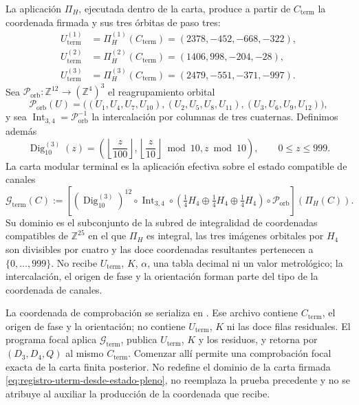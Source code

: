 La aplicación \(\Pi_H\), ejecutada dentro de la carta, produce a partir de
\(C_{\mathrm{term}}\) la coordenada firmada y sus tres órbitas de paso tres:
\begin{align*}
 U_{\mathrm{term}}^{(1)}&=\Pi_H^{(1)}(C_{\mathrm{term}})
                         =(2378,-452,-668,-322),\\
 U_{\mathrm{term}}^{(2)}&=\Pi_H^{(2)}(C_{\mathrm{term}})
                         =(1406,998,-204,-28),\\
 U_{\mathrm{term}}^{(3)}&=\Pi_H^{(3)}(C_{\mathrm{term}})
                         =(2479,-551,-371,-997).
\end{align*}
Sea \(\mathcal P_{\mathrm{orb}}:\mathbb Z^{12}\to(\mathbb Z^4)^3\) el
reagrupamiento orbital
\[
 \mathcal P_{\mathrm{orb}}(U)
 =\bigl((U_1,U_4,U_7,U_{10}),
        (U_2,U_5,U_8,U_{11}),
        (U_3,U_6,U_9,U_{12})\bigr),
\]
y sea \(\operatorname{Int}_{3,4}=\mathcal P_{\mathrm{orb}}^{-1}\) la
intercalación por columnas de tres cuaternas. Definimos además
\[
 \operatorname{Dig}_{10}^{(3)}(z)
 =\left(\left\lfloor\frac z{100}\right\rfloor,
         \left\lfloor\frac z{10}\right\rfloor\bmod10,
         z\bmod10\right),\qquad0\le z\le999.
\]
La carta modular terminal es la aplicación efectiva sobre el estado compatible
de canales
\begin{equation}
 \mathcal G_{\mathrm{term}}(C)
 :=\left[(\operatorname{Dig}_{10}^{(3)})^{12}
 \circ\operatorname{Int}_{3,4}
 \circ\left(\tfrac14H_4\oplus\tfrac14H_4
                    \oplus\tfrac14H_4\right)
  \circ\mathcal P_{\mathrm{orb}}\right]\!\left(\Pi_H(C)\right).
 \label{eq:registro-generador-modular-terminal}
\end{equation}
Su dominio es el subconjunto de la subred de integralidad de coordenadas
compatibles de \(\mathbb Z^{25}\)
en el que \(\Pi_H\) es integral, las tres imágenes orbitales por \(H_4\) son
divisibles por cuatro y las doce coordenadas resultantes pertenecen a
\(\{0,\ldots,999\}\). No recibe \(U_{\mathrm{term}}\), \(K\), \(\alpha\),
una tabla decimal ni un valor metrológico; la intercalación, el origen de fase
y la orientación forman parte del tipo de la coordenada de canales.

La coordenada de comprobación se serializa en
. Ese archivo contiene
\(C_{\mathrm{term}}\), el origen de fase y la orientación; no contiene
\(U_{\mathrm{term}}\), \(K\) ni las doce filas residuales. El programa focal
aplica \(\mathcal G_{\mathrm{term}}\), publica \(U_{\mathrm{term}}\), \(K\) y
los residuos, y retorna por \((D_3,D_4,Q)\) al mismo
\(C_{\mathrm{term}}\). Comenzar allí permite una comprobación focal exacta
de la carta finita posterior. No redefine el dominio de la carta firmada
\eqref{eq:registro-uterm-desde-estado-pleno}, no reemplaza la prueba precedente y no
se atribuye al auxiliar la producción de la coordenada que recibe.


